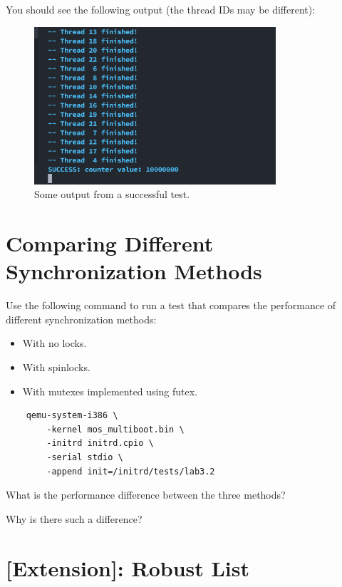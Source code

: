 You should see the following output (the thread IDs may be different):

\begin{figure}[h]
    \centering
    \includegraphics[width=0.8\textwidth]{assets/c3.futex-output.png}
    \caption{Some output from a successful test.}
\end{figure}

\section{Comparing Different Synchronization Methods}

Use the following command to run a test that compares the performance of different
synchronization methods:

\begin{itemize}
    \item With no locks.
    \item With spinlocks.
    \item With mutexes implemented using futex.
\end{itemize}

\begin{verbatim}
    qemu-system-i386 \
        -kernel mos_multiboot.bin \
        -initrd initrd.cpio \
        -serial stdio \
        -append init=/initrd/tests/lab3.2
\end{verbatim}

\begin{exercise}
    \item What is the performance difference between the three methods?
    \item Why is there such a difference?
\end{exercise}

\section{[Extension]: Robust List}


